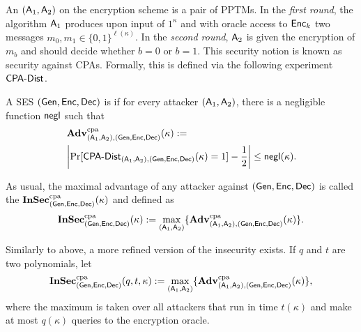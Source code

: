 An  $(\Att_{1},\Att_{2})$ on
the encryption scheme is a pair of \acp{PPTM}. In the \emph{first
  round}, the algorithm $\Att_{1}$ produces upon input of $1^{\kappa}$
and with oracle access to $\Enc_{k}$ two messages $m_{0},m_{1}\in
\{0,1\}^{\ell(\kappa)}$. In the \emph{second round}, $\Att_{2}$ is given
the encryption of $m_{b}$ and should decide whether $b=0$ or
$b=1$. This security notion is known as security against \acp{CPA}. 
Formally, this is defined via the following experiment
$\CPA-Dist$.


A \ac{SES} $(\Gen,\Enc,\Dec)$ is  if for every
attacker $(\Att_{1},\Att_{2})$, there is a negligible function $\negl$
such that 
\begin{align*}
  &\Adv_{(\Att_{1},\Att_{2}),(\Gen,\Enc,\Dec)}^{\cpa}(\kappa) :=\\
  &\left|\Pr[\CPA-Dist_{(\Att_{1},\Att_{2}),(\Gen,\Enc,\Dec)}(\kappa)=1]
    - \frac{1}{2}\right|\leq \negl(\kappa).
\end{align*}

As usual, the maximal advantage of any attacker against
$(\Gen,\Enc,\Dec)$ is called the 
$\InSec_{(\Gen,\Enc,\Dec)}^{\cpa}(\kappa)$ and defined as
\begin{align*}
  \InSec_{(\Gen,\Enc,\Dec)}^{\cpa}(\kappa) := \max_{(\Att_{1},\Att_{2})}\{\Adv^{\cpa}_{(\Att_{1},\Att_{2}),(\Gen,\Enc,\Dec)}(\kappa)\}.
\end{align*}

Similarly to above, a more refined version of the insecurity exists. If
$q$ and $t$ are two polynomials, let
\begin{align*}
  \InSec_{(\Gen,\Enc,\Dec)}^{\cpa}(q,t,\kappa) := \max_{(\Att_{1},\Att_{2})}\{\Adv^{\cpa}_{(\Att_{1},\Att_{2}),(\Gen,\Enc,\Dec)}(\kappa)\},
\end{align*}
where the maximum is taken over all attackers that run in time
$t(\kappa)$ and make at most $q(\kappa)$ queries to the encryption
oracle. 

